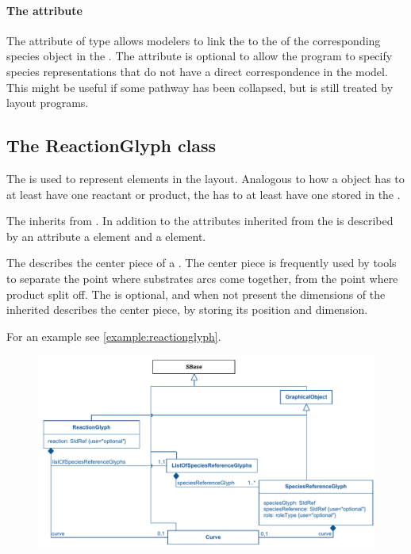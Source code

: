\paragraph{The  attribute}
The  attribute of type  allows modelers to link the \SpeciesGlyph to the  of the corresponding species object  in the \Model. The  attribute is optional to allow the  program to specify species representations that do not have a direct  correspondence in the model. This might be useful if some pathway has been collapsed, but is still treated by layout programs. 


\subsection{The ReactionGlyph class}
\label{reactionglyph-class}
The \ReactionGlyph is used to represent \Reaction elements in the 
layout. Analogous to how a \Reaction object has to at least have one reactant 
or product, the \ReactionGlyph has to at least have one 
\SpeciesReferenceGlyph stored in the \ListOfSpeciesReferenceGlyphs. 

The \ReactionGlyph inherits from \GraphicalObject. In addition to the attributes inherited from \GraphicalObject the 
\ReactionGlyph is described by an attribute  a \Curve 
element and a  element. 

The \Curve describes the center piece of a \ReactionGlyph. The center piece is frequently used by tools to separate the point where substrates arcs come together, from the point where product split off. The \Curve is optional, and when not present the dimensions of the inherited \BoundingBox describes the center piece, by storing its position and dimension. 

For an example see \ref{example:reactionglyph}. 


\begin{figure}[!h]
\includegraphics{uml/layout-reactionglyph-model-uml}\\
\label{uml:reactionglyph}
\end{figure}

